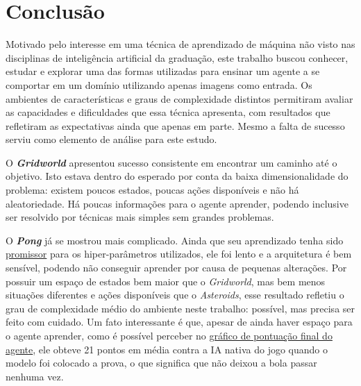 
\chapter{Conclusão}
\label{cap:conclusoes}

Motivado pelo interesse em uma técnica de aprendizado de máquina não visto nas disciplinas de inteligência artificial da graduação, este trabalho buscou conhecer, estudar e explorar uma das formas utilizadas para ensinar um agente a se comportar em um domínio utilizando apenas imagens como entrada.
Os ambientes de características e graus de complexidade distintos permitiram avaliar as capacidades e dificuldades que essa técnica apresenta, com resultados que refletiram as expectativas ainda que apenas em parte.
Mesmo a falta de sucesso serviu como elemento de análise para este estudo.

O \textbf{\textit{Gridworld}} apresentou sucesso consistente em encontrar um caminho até o objetivo.
Isto estava dentro do esperado por conta da baixa dimensionalidade do problema:
existem poucos estados, poucas ações disponíveis e não há aleatoriedade.
Há poucas informações para o agente aprender, podendo inclusive ser resolvido por técnicas mais simples sem grandes problemas.

O \textbf{\textit{Pong}} já se mostrou mais complicado.
Ainda que seu aprendizado tenha sido \hyperref[fig:pong_score]{promissor} para os hiper-parâmetros utilizados, ele foi lento e a arquitetura é bem sensível, podendo não conseguir aprender por causa de pequenas alterações.
Por possuir um espaço de estados bem maior que o \textit{Gridworld}, mas bem menos situações diferentes e ações disponíveis que o \textit{Asteroids}, esse resultado refletiu o grau de complexidade médio do ambiente neste trabalho: possível, mas precisa ser feito com cuidado.
Um fato interessante é que, apesar de ainda haver espaço para o agente aprender, como é possível perceber no \hyperref[fig:pong_score]{gráfico de pontuação final do agente}, ele obteve 21 pontos em média contra a IA nativa do jogo quando o modelo foi colocado a prova, o que significa que não deixou a bola passar nenhuma vez.

